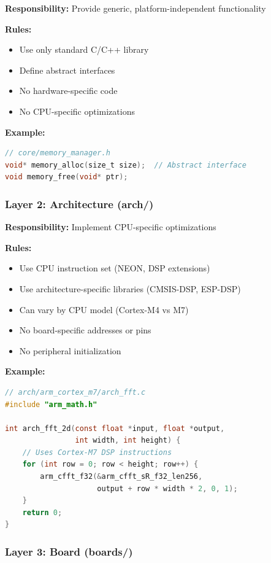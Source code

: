 \documentclass[11pt,a4paper]{article}
\begin{document}
\textbf{Responsibility:} Provide generic, platform-independent functionality

\textbf{Rules:}
\begin{itemize}
    \item[✓] Use only standard C/C++ library
    \item[✓] Define abstract interfaces
    \item[✗] No hardware-specific code
    \item[✗] No CPU-specific optimizations
\end{itemize}

\textbf{Example:}
\begin{lstlisting}[language=C,caption={Abstract memory interface (portable layer)}]
// core/memory_manager.h
void* memory_alloc(size_t size);  // Abstract interface
void memory_free(void* ptr);
\end{lstlisting}

\subsubsection{Layer 2: Architecture (arch/)}

\textbf{Responsibility:} Implement CPU-specific optimizations

\textbf{Rules:}
\begin{itemize}
    \item[✓] Use CPU instruction set (NEON, DSP extensions)
    \item[✓] Use architecture-specific libraries (CMSIS-DSP, ESP-DSP)
    \item[✓] Can vary by CPU model (Cortex-M4 vs M7)
    \item[✗] No board-specific addresses or pins
    \item[✗] No peripheral initialization
\end{itemize}

\textbf{Example:}
\begin{lstlisting}[language=C,caption={ARM Cortex-M7 FFT implementation (architecture layer)}]
// arch/arm_cortex_m7/arch_fft.c
#include "arm_math.h"

int arch_fft_2d(const float *input, float *output,
                int width, int height) {
    // Uses Cortex-M7 DSP instructions
    for (int row = 0; row < height; row++) {
        arm_cfft_f32(&arm_cfft_sR_f32_len256,
                     output + row * width * 2, 0, 1);
    }
    return 0;
}
\end{lstlisting}

\subsubsection{Layer 3: Board (boards/)}
\end{document}
